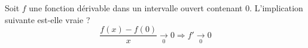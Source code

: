 Soit $f$ une fonction d{\'e}rivable dans un intervalle ouvert contenant 0. L'implication suivante est-elle vraie ?
\[\frac{f(x)-f(0)}{x}
\underset{0}{\rightarrow}0
\Rightarrow
f'\underset{0}{\rightarrow}0\]
\bigskip